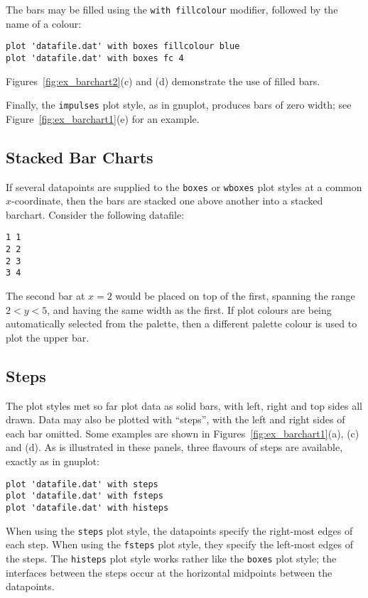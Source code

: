 The bars may be filled using the \texttt{with fillcolour} modifier, followed by the name of a
colour:

\begin{verbatim} 
plot 'datafile.dat' with boxes fillcolour blue
plot 'datafile.dat' with boxes fc 4
\end{verbatim}

\noindent Figures~\ref{fig:ex_barchart2}(c) and (d) demonstrate the use of
filled bars.

Finally, the \texttt{impulses} plot style, as in gnuplot, produces bars of zero
width; see Figure~\ref{fig:ex_barchart1}(e) for an example.

\subsection{Stacked Bar Charts}

If several datapoints are supplied to the \texttt{boxes} or \texttt{wboxes}
plot styles at a common $x$-coordinate, then the bars are stacked one above
another into a stacked barchart. Consider the following datafile:

\begin{verbatim} 
1 1
2 2
2 3
3 4
\end{verbatim}

\noindent The second bar at $x=2$ would be placed on top of the first, spanning
the range $2<y<5$, and having the same width as the first. If plot colours are
being automatically selected from the palette, then a different palette colour
is used to plot the upper bar.

\subsection{Steps}

The plot styles met so far plot data as solid bars, with left, right and top
sides all drawn. Data may also be plotted with ``steps'', with the left and
right sides of each bar omitted. Some examples are shown in
Figures~\ref{fig:ex_barchart1}(a), (c) and (d).  As is illustrated in these
panels, three flavours of steps are available, exactly as in gnuplot:

\begin{verbatim}
plot 'datafile.dat' with steps 
plot 'datafile.dat' with fsteps 
plot 'datafile.dat' with histeps
\end{verbatim}

When using the \texttt{steps} plot style, the datapoints specify the right-most
edges of each step. When using the \texttt{fsteps} plot style, they specify the
left-most edges of the steps. The \texttt{histeps} plot style works rather like
the \texttt{boxes} plot style; the interfaces between the steps occur at the
horizontal midpoints between the datapoints.

